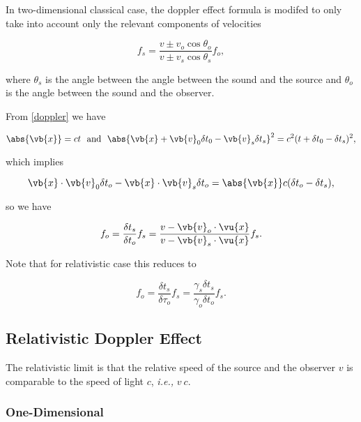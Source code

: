 \documentclass[english,a4paper,12pt]{report}
\begin{document}
In two-dimensional classical case, the doppler effect formula is modifed to only take into account only the relevant components of velocities

\begin{equation}
    f_{s} = \frac{v \pm v_{o} \cos \theta _{o}  }{v \pm v_{s} \cos \theta _{s} } f_{o} ,  
\end{equation}

where \(\theta _{s} \) is the angle between the angle between the sound and the source and \(\theta _{o} \) is the angle between the sound and the observer. 


From \cref{doppler} we have 

\begin{equation}
    \abs{\vb{x} } = ct ~\text { and }~ \abs{\vb{x} + \vb{v} _{0}\delta t_0 - \vb{v} _{s} \delta t_{s}   }^2 = c^2(t+\delta t_0 -\delta t_{s} )^2,  
\end{equation}

which implies 

\begin{equation}
    \vb{x} \cdot \vb{v} _{0}\delta t_o - \vb{x} \cdot \vb{v} _{s} \delta t_{o} = \abs{\vb{x} } c(\delta t_o - \delta t_{s} ),    
\end{equation}

so we have 

\begin{equation}
    f_{o} = \frac{\delta t_s }{\delta t_{o} } f_{s} = \frac{v-\vb{v} _{o} \cdot \vu{x}   }{v-\vb{v} _{s}\cdot \vu{x}  } f_{s}.  
\end{equation}

Note that for relativistic case this reduces to 

\begin{equation}
    f_{o} = \frac{\delta t_{s} }{\delta \tau _{o} } f_{s} = \frac{\gamma _{s}\delta t_{s}  }{\gamma _{o} \delta t_{o}  } f_{s}.    
\end{equation}

\subsection{Relativistic Doppler Effect}

The relativistic limit is that the relative speed of the source and the observer \(v\) is comparable to the speed of light \(c\), \textit{i.e.,} \(v ~ c\). 

\subsubsection{One-Dimensional}
\end{document}
